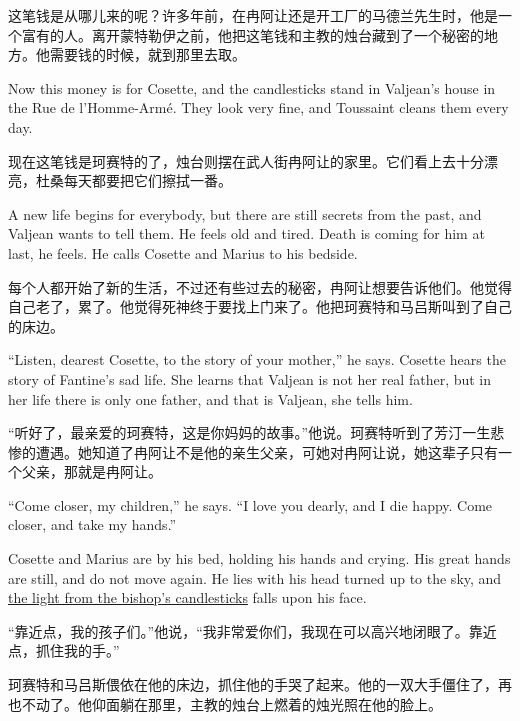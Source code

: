 \documentclass[fontset=ubuntu, zihao=5]{ctexart}
\begin{document}
\begin{paracol}{2}
\switchcolumn

这笔钱是从哪儿来的呢？许多年前，在冉阿让还是开工厂的马德兰先生时，他是一个富有的人。离开蒙特勒伊之前，他把这笔钱和主教的烛台藏到了一个秘密的地方。他需要钱的时候，就到那里去取。

\switchcolumn*

Now this money is for Cosette, and the candlesticks stand in Valjean's house in the Rue de l'Homme-Armé. They look very fine, and Toussaint cleans them every day.


\switchcolumn

现在这笔钱是珂赛特的了，烛台则摆在武人街冉阿让的家里。它们看上去十分漂亮，杜桑每天都要把它们擦拭一番。

\switchcolumn*

A new life begins for everybody, but there are still secrets from the past, and Valjean wants to tell them. He feels old and tired. Death is coming for him at last, he feels. He calls Cosette and Marius to his bedside.

\switchcolumn

每个人都开始了新的生活，不过还有些过去的秘密，冉阿让想要告诉他们。他觉得自己老了，累了。他觉得死神终于要找上门来了。他把珂赛特和马吕斯叫到了自己的床边。

\switchcolumn*

``Listen, dearest Cosette, to the story of your mother,'' he says. Cosette hears the story of Fantine's sad life. She learns that Valjean is not her real father, but in her life there is only one father, and that is Valjean, she tells him.

\switchcolumn

“听好了，最亲爱的珂赛特，这是你妈妈的故事。”他说。珂赛特听到了芳汀一生悲惨的遭遇。她知道了冉阿让不是他的亲生父亲，可她对冉阿让说，她这辈子只有一个父亲，那就是冉阿让。

\switchcolumn*

``Come closer, my children,'' he says. ``I love you dearly, and I die happy. Come closer, and take my hands.''

Cosette and Marius are by his bed, holding his hands and crying. His great hands are still, and do not move again. He lies with his head turned up to the sky, and \uline{the light from the bishop's candlesticks} falls upon his face.

\switchcolumn

“靠近点，我的孩子们。”他说，“我非常爱你们，我现在可以高兴地闭眼了。靠近点，抓住我的手。”

珂赛特和马吕斯偎依在他的床边，抓住他的手哭了起来。他的一双大手僵住了，再也不动了。他仰面躺在那里，主教的烛台上燃着的烛光照在他的脸上。

\end{paracol}
\clearpage

 \newlength{\originalVOffset}
 \newlength{\originalHOffset}
 \setlength{\originalVOffset}{\voffset}
 \setlength{\originalHOffset}{\hoffset}

 \setlength{\voffset}{0cm}
 \setlength{\hoffset}{0cm}
 
 \setlength{\voffset}{\originalVOffset}
 \setlength{\hoffset}{\originalHOffset}
\end{document}
